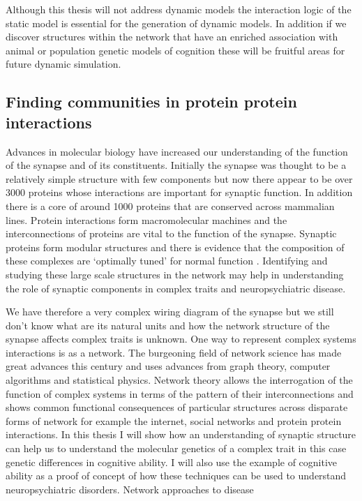 Although this thesis will not address dynamic models the interaction logic of the static model is essential for the generation of dynamic models. In addition if we discover structures within the network that have an enriched association with animal or population genetic models of cognition these will be fruitful areas for future dynamic simulation. 

\subsection{Finding communities in protein protein interactions}
Advances in molecular biology have increased our understanding of the function of the synapse and of its constituents. Initially the synapse was thought to be a relatively simple structure with few components but now there appear to be over 3000 proteins whose interactions are important for synaptic function. In addition there is a core of around 1000 proteins that are conserved across mammalian lines.  Protein interactions form macromolecular machines and the interconnections of proteins are vital to the function of the synapse. 
Synaptic proteins form modular structures \cite{pocklington2006proteomes} and there is evidence that the composition of these complexes are ‘optimally tuned’ for normal function \cite{grant2012synaptopathies}. Identifying and studying these large scale structures in the network may help in understanding the role of synaptic components in complex traits and neuropsychiatric disease.





We have therefore a very complex wiring diagram of the synapse but we still don’t know what are its natural units and how the network structure of the synapse affects complex traits is unknown. One way to represent complex systems interactions is as a network. The burgeoning field of network science has made great advances this century and uses advances from graph theory, computer algorithms and statistical physics. Network theory allows the interrogation of the function of complex systems in terms of the pattern of their interconnections and shows common functional consequences of particular structures across disparate forms of network for example the internet, social networks and protein protein interactions. In this thesis I will show how an understanding of synaptic structure can help us to understand the molecular genetics of a complex trait in this case genetic differences in cognitive ability. I will also use the example of cognitive ability as a proof of concept of how these techniques can be used to understand neuropsychiatric disorders. Network approaches to disease


